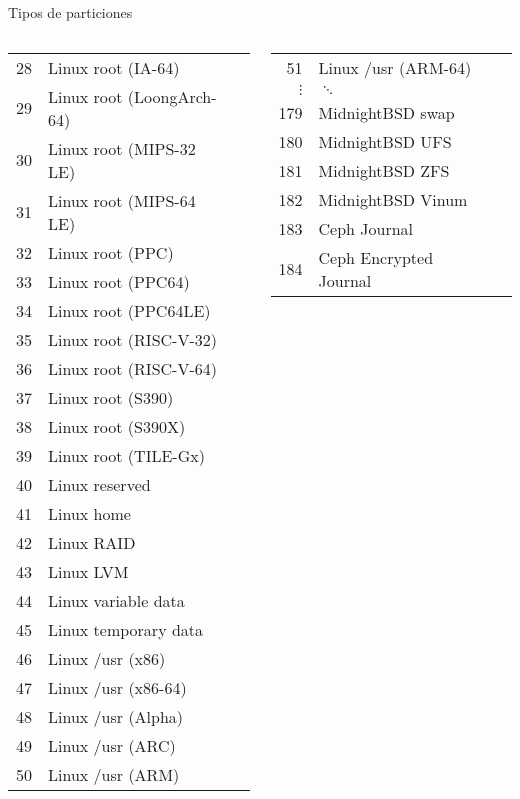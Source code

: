 \begin{frame}[c]{Tipos de particiones}
{\begin{columns}
\begin{table}[]
\begin{tabular}{rll}
 28&Linux root (IA-64)             \\
 29&Linux root (LoongArch-64)      \\
 30&Linux root (MIPS-32 LE)        \\
 31&Linux root (MIPS-64 LE)        \\
 32&Linux root (PPC)               \\
 33&Linux root (PPC64)             \\
 34&Linux root (PPC64LE)           \\
 35&Linux root (RISC-V-32)         \\
 36&Linux root (RISC-V-64)         \\
 37&Linux root (S390)              \\
 38&Linux root (S390X)             \\
 39&Linux root (TILE-Gx)           \\
 40&Linux reserved                 \\
 41&Linux home                     \\
 42&Linux RAID                     \\
 43&Linux LVM                      \\
 44&Linux variable data            \\
 45&Linux temporary data           \\
 46&Linux /usr (x86)               \\
 47&Linux /usr (x86-64)            \\
 48&Linux /usr (Alpha) \\
 49&Linux /usr (ARC)  \\
 50&Linux /usr (ARM) \\
  \end{tabular}
  \end{table}
  \begin{table}[]
  \begin{tabular}{rll}
 51&Linux /usr (ARM-64)   \\
 $\vdots$ & $\ddots$ \\
179&MidnightBSD swap              \\
180&MidnightBSD UFS               \\
181&MidnightBSD ZFS               \\
182&MidnightBSD Vinum             \\
183&Ceph Journal                  \\
184&Ceph Encrypted Journal        \\

\end{tabular}
\end{table}
\end{columns}}
\end{frame}

